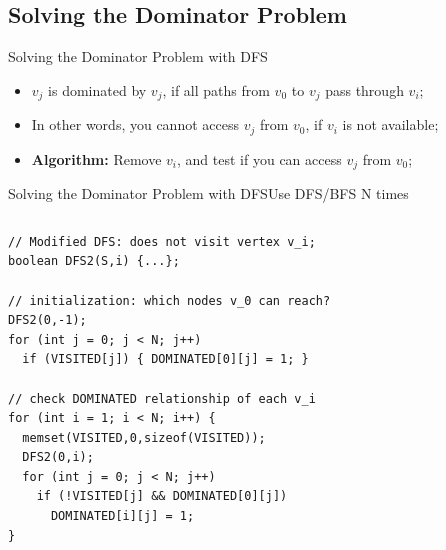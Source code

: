 \subsection{Solving the Dominator Problem}

\begin{frame}[fragile]{Solving the Dominator Problem with DFS}
  \begin{exampleblock}{}
    \begin{itemize}
      \item $v_j$ is dominated by $v_j$, if all paths from $v_0$ to $v_j$ pass through $v_i$;
      \item In other words, you cannot access $v_j$ from $v_0$, if $v_i$ is not available;
      \item {\bf Algorithm:} Remove $v_i$, and test if you can access $v_j$ from $v_0$;
    \end{itemize}
  \end{exampleblock}\bigskip

  
\end{frame}

\begin{frame}[fragile]{Solving the Dominator Problem with DFS}{Use DFS/BFS N times}

  \begin{columns}
    

    \begin{exampleblock}{}
{\smaller
\begin{verbatim}
// Modified DFS: does not visit vertex v_i;
boolean DFS2(S,i) {...};

// initialization: which nodes v_0 can reach?
DFS2(0,-1);
for (int j = 0; j < N; j++)
  if (VISITED[j]) { DOMINATED[0][j] = 1; }

// check DOMINATED relationship of each v_i
for (int i = 1; i < N; i++) {
  memset(VISITED,0,sizeof(VISITED));
  DFS2(0,i);
  for (int j = 0; j < N; j++)
    if (!VISITED[j] && DOMINATED[0][j])
      DOMINATED[i][j] = 1;
}
\end{verbatim}}
    \end{exampleblock}
  \end{columns}
\end{frame}



